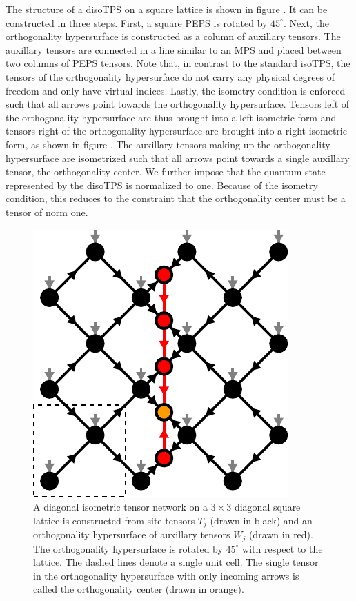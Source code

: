 The structure of a disoTPS on a square lattice is shown in figure . It can be constructed in three steps. First, a square PEPS is rotated by $45^\circ$. Next, the orthogonality hypersurface is constructed as a column of auxillary tensors. The auxillary tensors are connected in a line similar to an MPS and placed between two columns of PEPS tensors. Note that, in contrast to the standard isoTPS, the tensors of the orthogonality hypersurface do not carry any physical degrees of freedom and only have virtual indices. Lastly, the isometry condition is enforced such that all arrows point towards the orthogonality hypersurface. Tensors left of the orthogonality hypersurface are thus brought into a left-isometric form and tensors right of the orthogonality hypersurface are brought into a right-isometric form, as shown in figure . The auxillary tensors making up the orthogonality hypersurface are isometrized such that all arrows point towards a single auxillary tensor, the orthogonality center. We further impose that the quantum state represented by the disoTPS is normalized to one. Because of the isometry condition, this reduces to the constraint that the orthogonality center must be a tensor of norm one.\par
\begin{figure}[h]
	\centering
	\includegraphics[scale=1]{figures/tikz/disoTPS/disoTPS_structure/disoTPS_structure.pdf}
	\caption{A diagonal isometric tensor network on a $3\times3$ diagonal square lattice is constructed from site tensors $T_j$ (drawn in black) and an orthogonality hypersurface of auxillary tensors $W_j$ (drawn in red). The orthogonality hypersurface is rotated by $45^\circ$ with respect to the lattice. The dashed lines denote a single unit cell. The single tensor in the orthogonality hypersurface with only incoming arrows is called the orthogonality center (drawn in orange).}
	\label{fig:disoTPS_structure}
\end{figure}
